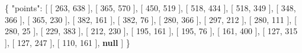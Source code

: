 \documentclass[
  12pt,
  a4paper,
]{article}
\newenvironment{Shaded}{}{}
\newcommand{\DataTypeTok}[1]{\textcolor[rgb]{0.56,0.13,0.00}{#1}}
\newcommand{\DecValTok}[1]{\textcolor[rgb]{0.25,0.63,0.44}{#1}}
\newcommand{\FunctionTok}[1]{\textcolor[rgb]{0.02,0.16,0.49}{#1}}
\newcommand{\KeywordTok}[1]{\textcolor[rgb]{0.00,0.44,0.13}{\textbf{#1}}}
\newcommand{\OtherTok}[1]{\textcolor[rgb]{0.00,0.44,0.13}{#1}}
\begin{document}
\begin{Shaded}
\begin{Highlighting}[]
\FunctionTok{\{}
    \DataTypeTok{"points"}\FunctionTok{:} \OtherTok{[}
        \OtherTok{[}
            \DecValTok{263}\OtherTok{,}
            \DecValTok{638}
        \OtherTok{],}
        \OtherTok{[}
            \DecValTok{365}\OtherTok{,}
            \DecValTok{570}
        \OtherTok{],}
        \OtherTok{[}
            \DecValTok{450}\OtherTok{,}
            \DecValTok{519}
        \OtherTok{],}
        \OtherTok{[}
            \DecValTok{518}\OtherTok{,}
            \DecValTok{434}
        \OtherTok{],}
        \OtherTok{[}
            \DecValTok{518}\OtherTok{,}
            \DecValTok{349}
        \OtherTok{],}
        \OtherTok{[}
            \DecValTok{348}\OtherTok{,}
            \DecValTok{366}
        \OtherTok{],}
        \OtherTok{[}
            \DecValTok{365}\OtherTok{,}
            \DecValTok{230}
        \OtherTok{],}
        \OtherTok{[}
            \DecValTok{382}\OtherTok{,}
            \DecValTok{161}
        \OtherTok{],}
        \OtherTok{[}
            \DecValTok{382}\OtherTok{,}
            \DecValTok{76}
        \OtherTok{],}
        \OtherTok{[}
            \DecValTok{280}\OtherTok{,}
            \DecValTok{366}
        \OtherTok{],}
        \OtherTok{[}
            \DecValTok{297}\OtherTok{,}
            \DecValTok{212}
        \OtherTok{],}
        \OtherTok{[}
            \DecValTok{280}\OtherTok{,}
            \DecValTok{111}
        \OtherTok{],}
        \OtherTok{[}
            \DecValTok{280}\OtherTok{,}
            \DecValTok{25}
        \OtherTok{],}
        \OtherTok{[}
            \DecValTok{229}\OtherTok{,}
            \DecValTok{383}
        \OtherTok{],}
        \OtherTok{[}
            \DecValTok{212}\OtherTok{,}
            \DecValTok{230}
        \OtherTok{],}
        \OtherTok{[}
            \DecValTok{195}\OtherTok{,}
            \DecValTok{161}
        \OtherTok{],}
        \OtherTok{[}
            \DecValTok{195}\OtherTok{,}
            \DecValTok{76}
        \OtherTok{],}
        \OtherTok{[}
            \DecValTok{161}\OtherTok{,}
            \DecValTok{400}
        \OtherTok{],}
        \OtherTok{[}
            \DecValTok{127}\OtherTok{,}
            \DecValTok{315}
        \OtherTok{],}
        \OtherTok{[}
            \DecValTok{127}\OtherTok{,}
            \DecValTok{247}
        \OtherTok{],}
        \OtherTok{[}
            \DecValTok{110}\OtherTok{,}
            \DecValTok{161}
        \OtherTok{],}
        \KeywordTok{null}
    \OtherTok{]}
\FunctionTok{\}}
\end{Highlighting}
\end{Shaded}
\end{document}
